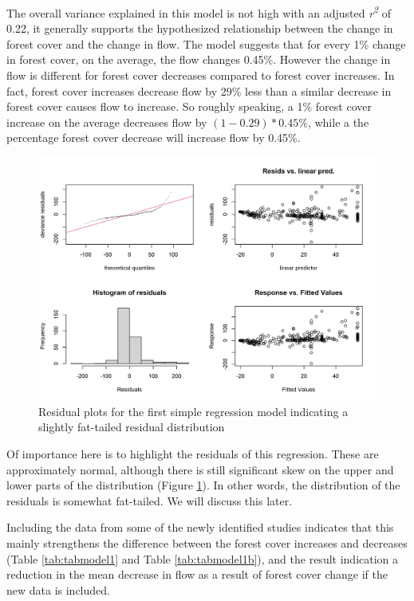 \documentclass[]{elsarticle} %
\begin{document}
The overall variance explained in this model is not high with an adjusted \emph{r\textsuperscript{2}} of 0.22, it generally supports the hypothesized relationship between the change in forest cover and the change in flow. The model suggests that for every 1\% change in forest cover, on the average, the flow changes 0.45\%. However the change in flow is different for forest cover decreases compared to forest cover increases. In fact, forest cover increases decrease flow by 29\% less than a similar decrease in forest cover causes flow to increase. So roughly speaking, a 1\% forest cover increase on the average decreases flow by \((1 - 0.29)*0.45\%\), while a the percentage forest cover decrease will increase flow by 0.45\%.

\begin{figure}
\includegraphics[width=0.9\linewidth]{residual_plot_model1} \caption{Residual plots for the first simple regression model indicating a slightly fat-tailed residual distribution}\label{fig:gamcheck}
\end{figure}

Of importance here is to highlight the residuals of this regression. These are approximately normal, although there is still significant skew on the upper and lower parts of the distribution (Figure \ref{fig:gamcheck}). In other words, the distribution of the residuals is somewhat fat-tailed. We will discuss this later.

Including the data from some of the newly identified studies indicates that this mainly strengthens the difference between the forest cover increases and decreases (Table \ref{tab:tabmodel1} and Table \ref{tab:tabmodel1b}), and the result indication a reduction in the mean decrease in flow as a result of forest cover change if the new data is included.
\end{document}
